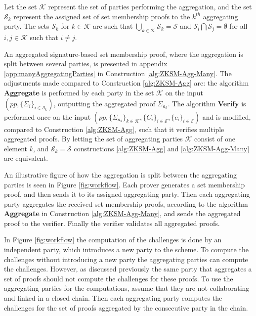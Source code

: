 Let the set $\mathcal{K}$ represent the set of parties performing the aggregation, and the set $\mathcal{S}_k$ represent the assigned set of set membership proofs to the $k^{th}$ aggregating party. The sets $\mathcal{S}_k$ for $k\in\mathcal{K}$ are such that $\bigcup_{k\in\mathcal{K}}\mathcal{S}_k = \mathcal{S}$ and $\mathcal{S}_i\bigcap \mathcal{S}_j= \emptyset$ for all $i,j\in\mathcal{K}$ such that $i\neq j$. 

An aggregated signature-based set membership proof, where the aggregation is split between several parties, is presented in appendix \ref{app:manyAggregatingParties} in Construction \ref{alg:ZKSM-Agg-Many}. The adjustments made compared to Construction \ref{alg:ZKSM-Agg} are: the algorithm \textbf{Aggregate} is performed by each party in the set $\mathcal{K}$ on the input $(pp,\{\Sigma_i\}_{i\in\mathcal{S}_k})$, outputting the aggregated proof $\Sigma_{a_k}$. The algorithm \textbf{Verify} is performed once on the input $(pp,\{\Sigma_{a_k}\}_{k\in\mathcal{K}},\{C_i\}_{i\in\mathcal{S}},\{c_i\}_{i\in\mathcal{S}} )$ and  is modified, compared to Construction \ref{alg:ZKSM-Agg}, such that it verifies multiple aggregated proofs. By letting the set of aggregating parties $\mathcal{K}$ consist of one element $k$, and $\mathcal{S}_k  = \mathcal{S}$ constructions \ref{alg:ZKSM-Agg} and \ref{alg:ZKSM-Agg-Many} are equivalent. 


An illustrative figure of how the aggregation is split between the aggregating parties is seen in Figure \ref{fig:workflow}. Each prover generates a set membership proof, and then sends it to its assigned aggregating party. Then each aggregating party aggregates the received set membership proofs, according to the algorithm \textbf{Aggregate} in Construction \ref{alg:ZKSM-Agg-Many}, and sends the aggregated proof to the verifier. Finally the verifier validates all aggregated proofs.

In Figure \ref{fig:workflow} the computation of the challenges is done by an independent party, which introduces a new party to the scheme. To compute the challenges without introducing a new party the aggregating parties can compute the challenges.  However, as discussed previously the same party that aggregates a set of proofs should not compute the challenges for these proofs. To use the aggregating parties for the computations, assume that they are not collaborating and linked in a closed chain. Then each aggregating party computes the challenges for the set of proofs aggregated by the consecutive party in the chain.  



